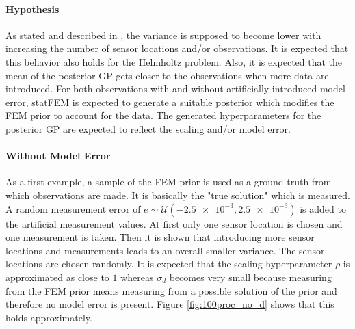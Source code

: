 \documentclass[%
  a4paper,oneside,%
  11pt,%
  smallchapters,
  style=printdev,
  extramargin,
  green,%
  rgb, <cmyk>
  ]{tubsbook}
\begin{document}
\paragraph{Hypothesis}
As stated and described in \cite{rasmussen2006}, the variance is supposed to become lower with increasing the number of sensor locations and/or observations. It is expected that this behavior also holds for the Helmholtz problem. Also, it is expected that the mean of the posterior GP gets closer to the observations when more data are introduced. For both observations with and without artificially introduced model error, statFEM is expected to generate a suitable posterior which modifies the FEM prior to account for the data. The generated hyperparameters for the posterior GP are expected to reflect the scaling and/or model error.


\paragraph{Without Model Error}
As a first example, a sample of the FEM prior is used as a ground truth from which observations are made. It is basically the "true solution" which is measured. A random measurement error of $e \sim \mathcal{U}(\num{-2.5e-3}, \num{2.5e-3})$ is added to the artificial measurement values. At first only one sensor location is chosen and one measurement is taken. Then it is shown that introducing more sensor locations and measurements leads to an overall smaller variance. The sensor locations are chosen randomly. It is expected that the scaling hyperparameter $\rho$ is approximated as close to $1$ whereas $\sigma_d$ becomes very small because measuring from the FEM prior means measuring from a possible solution of the prior and therefore no model error is present. Figure \ref{fig:100proc_no_d} shows that this holds approximately. %
\end{document}
